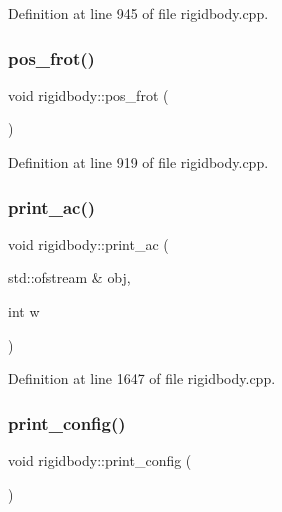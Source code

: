 Definition at line 945 of file rigidbody.\+cpp.

\mbox{\label{classrigidbody_a839b5b063891c8fc71ad3dd990cfbf4a}} 
\subsubsection{\texorpdfstring{pos\+\_\+frot()}{pos\_frot()}}
{\footnotesize\ttfamily void rigidbody\+::pos\+\_\+frot (\begin{DoxyParamCaption}{ }\end{DoxyParamCaption})}



Definition at line 919 of file rigidbody.\+cpp.

\mbox{\label{classrigidbody_a24ffb7711348dc2813b8c07e899d065f}} 
\subsubsection{\texorpdfstring{print\+\_\+ac()}{print\_ac()}}
{\footnotesize\ttfamily void rigidbody\+::print\+\_\+ac (\begin{DoxyParamCaption}\item[{std\+::ofstream \&}]{obj,  }\item[{int}]{w }\end{DoxyParamCaption})}



Definition at line 1647 of file rigidbody.\+cpp.

\mbox{\label{classrigidbody_aa486e3fa6409f5031188193e37eadc10}} 
\subsubsection{\texorpdfstring{print\+\_\+config()}{print\_config()}}
{\footnotesize\ttfamily void rigidbody\+::print\+\_\+config (\begin{DoxyParamCaption}{ }\end{DoxyParamCaption})}



